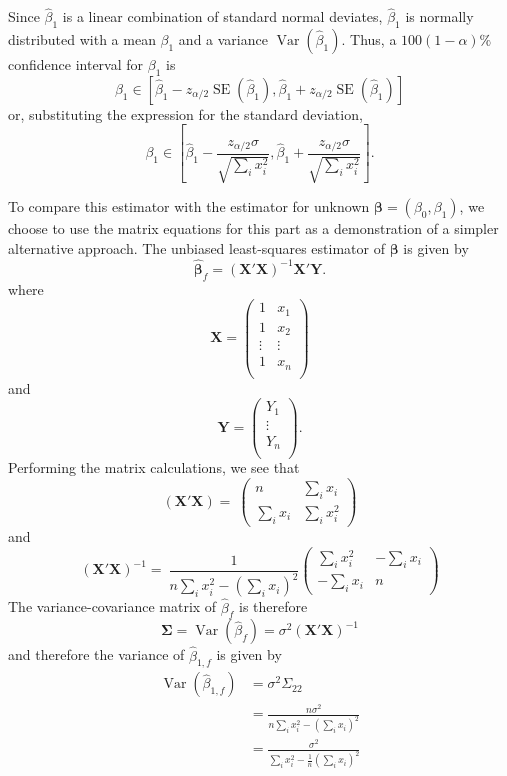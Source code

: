 \documentclass[
]{article}
\begin{document}
Since \(\hat\beta_1\) is a linear combination of standard normal
deviates, \(\hat\beta_1\) is normally distributed with a mean
\(\beta_1\) and a variance \(\operatorname{Var}(\hat\beta_1)\). Thus, a
\(100(1-\alpha)\%\) confidence interval for \(\beta_1\) is \[
   \beta_1 \in \left[\hat\beta_1 - z_{\alpha/2} \operatorname{SE}(\hat\beta_1),\hat\beta_1 + z_{\alpha/2} \operatorname{SE}(\hat\beta_1)\right]
\] or, substituting the expression for the standard deviation, \[
   \beta_1 \in \left[\hat\beta_1 - \frac{z_{\alpha/2} \sigma}{\sqrt{\sum_i x_i^2}}, \hat\beta_1 + \frac{z_{\alpha/2} \sigma}{\sqrt{\sum_i x_i^2}}\right].
\]

To compare this estimator with the estimator for unknown
\(\bm{\beta }= (\beta_0, \beta_1)\), we choose to use the matrix
equations for this part as a demonstration of a simpler alternative
approach. The unbiased least-squares estimator of \(\bm{\beta}\) is
given by \[
   \hat{\bm{\beta}}_f = (\bm{X}' \bm{X})^{-1} \bm{X}' \bm{Y}.
\] where \[
   \bm{X} =
   \begin{pmatrix}
      1 & x_1\\
      1 & x_2\\
      \vdots & \vdots\\
      1 & x_n\\
   \end{pmatrix}
\] and \[
   \bm{Y} =
   \begin{pmatrix}
      Y_1\\
      \vdots\\
      Y_n\\
   \end{pmatrix}.
\] Performing the matrix calculations, we see that \[
   \left(\bm{X}' \bm{X}\right) =\
   \begin{pmatrix}
      n                 &     \sum_i x_i\\
      \sum_i x_i        &     \sum_i x_i^2
   \end{pmatrix}
\] and \[
   \left(\bm{X}' \bm{X}\right)^{-1} =\
   \frac{1}{n \sum_i x_i^2 - \left(\sum_i x_i\right)^2}
   \begin{pmatrix}
      \sum_i x_i^2      &     -\sum_i x_i\\
      -\sum_i x_i        &     n
   \end{pmatrix}
\] The variance-covariance matrix of \(\hat\beta_f\) is therefore \[
   \bm{\Sigma} = \operatorname{Var}(\hat\beta_f) = \sigma^2 \left(\bm{X}' \bm{X}\right)^{-1}
\] and therefore the variance of \(\hat\beta_{1,f}\) is given by
\begin{align*}
   \operatorname{Var}(\hat\beta_{1,f})
      &= \sigma^2 \Sigma_{2 2}\\
      &= \frac{n \sigma^2}{n \sum_i x_i^2 - \left(\sum_i x_i\right)^2}\\
      &= \frac{\sigma^2}{\sum_i x_i^2 - \frac{1}{n}\left(\sum_i x_i\right)^2}\\
\end{align*}
\end{document}
